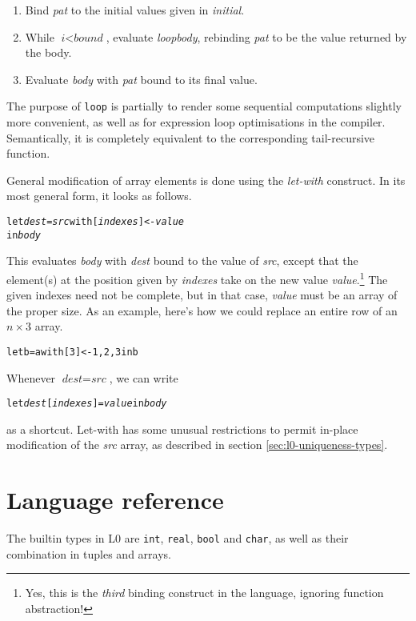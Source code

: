 \documentclass[oneside]{memoir}
\newcommand\boolt[0]{\texttt{bool}}
\newcommand\realt[0]{\texttt{real}}
\newcommand\chart[0]{\texttt{char}}
\newcommand\intt[0]{\texttt{int}}
\begin{document}
\begin{enumerate}
  \item Bind \textit{pat} to the initial values given in \textit{initial}.
  \item While $\textit{i} < \textit{bound}$, evaluate \textit{loopbody},
    rebinding \textit{pat} to be the value returned by the body.
  \item Evaluate \textit{body} with \textit{pat} bound to its final
    value.
\end{enumerate}
The purpose of \texttt{loop} is partially to render some sequential
computations slightly more convenient, as well as for expression loop
optimisations in the compiler.  Semantically, it is completely
equivalent to the corresponding tail-recursive function.

General modification of array elements is done using the
\emph{let-with} construct.  In its most general form, it looks as
follows.
\begin{alltt}
  let \textit{dest} = \textit{src} with [\textit{indexes}] <- \textit{value}
  in \textit{body}
\end{alltt}
This evaluates \textit{body} with \textit{dest} bound to the value of
\textit{src}, except that the element(s) at the position given by
\textit{indexes} take on the new value \textit{value}.\footnote{Yes,
  this is the \emph{third} binding construct in the language, ignoring
  function abstraction!}  The given indexes need not be complete, but
in that case, \textit{value} must be an array of the proper size.  As
an example, here's how we could replace an entire row of an
$n\times3$ array.
\begin{alltt}
  let b = a with [3] <- {1,2,3} in b
\end{alltt}
Whenever $\textit{dest} = \textit{src}$, we can write
\begin{alltt}
  let \textit{dest}[\textit{indexes}] = \textit{value} in \textit{body}
\end{alltt}
as a shortcut.  Let-with has some unusual restrictions to permit
in-place modification of the \textit{src} array, as described in
section \ref{sec:l0-uniqueness-types}.

\section{Language reference}
\label{sec:l0-reference}

The builtin types in L0 are \intt{}, \realt{}, \boolt{} and \chart{}, as
well as their combination in tuples and arrays.
\end{document}
